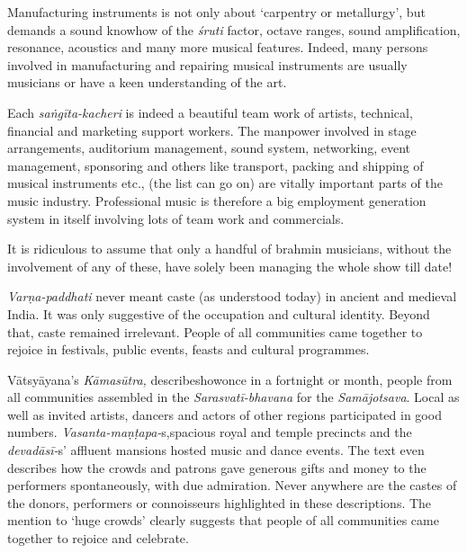 Manufacturing instruments is not only about ‘carpentry or metallurgy’, but demands a sound knowhow of the \textit{śruti} factor, octave ranges, sound amplification, resonance, acoustics and many more musical features. Indeed, many persons involved in manufacturing and repairing musical instruments are usually musicians or have a keen understanding of the art.

Each \textit{saṅgīta-kacheri} is indeed a beautiful team work of artists, technical, financial and marketing support workers. The manpower involved in stage arrangements, auditorium management, sound system, networking, event management, sponsoring and others like transport, packing and shipping of musical instruments etc., (the list can go on) are vitally important parts of the music industry. Professional music is therefore a big employment generation system in itself involving lots of team work and commercials.

It is ridiculous to assume that only a handful of brahmin musicians, without the involvement of any of these, have solely been managing the whole show till date!

\textit{Varṇa-paddhati} never meant caste (as understood today) in ancient and medieval India. It was only suggestive of the occupation and cultural identity. Beyond that, caste remained irrelevant. People of all communities came together to rejoice in festivals, public events, feasts and cultural programmes.

Vātsyāyana’s \textit{Kāmasūtra,} describeshowonce in a fortnight or month, people from all communities assembled in the \textit{Sarasvatī-bhavana} for the \textit{Samājotsava}. Local as well as invited artists, dancers and actors of other regions participated in good numbers. \textit{Vasanta-maṇṭapa-}s,\break spacious royal and temple precincts and the \textit{devadāsī-}s’ affluent mansions hosted music and dance events. The text even describes how the crowds and patrons gave generous gifts and money to the performers spontaneously, with due admiration. Never anywhere are the castes of the donors, performers or connoisseurs highlighted in these descriptions. The mention to ‘huge crowds’ clearly suggests that people of all communities came together to rejoice and celebrate.

